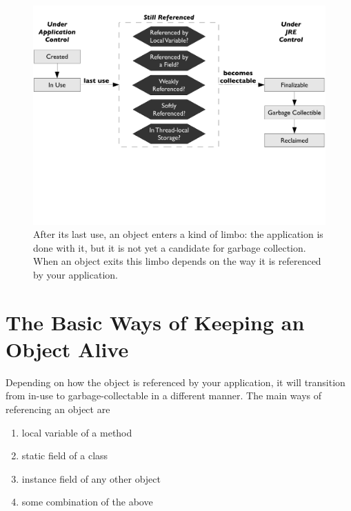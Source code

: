 \begin{figure}
	\centering
	\includegraphics[width=\textwidth]{part2/Figures/lifetime/states}
	\caption{After its last use, an object enters a kind of limbo: the application
	is done with it, but it is not yet a candidate for garbage collection. When an
	object exits this limbo depends on the way it is referenced by your
	application.}
		\label{fig:limbo-exit}
\end{figure}

\section{The Basic Ways of Keeping an Object Alive}
Depending on how the object is referenced by your application, it will
transition from in-use to garbage-collectable in a different manner. The main
ways of referencing an object are

\begin{enumerate}
  \item local variable of a method
  \item static field of a class
  \item instance field of any other object
  \item some combination of the above
\end{enumerate}


